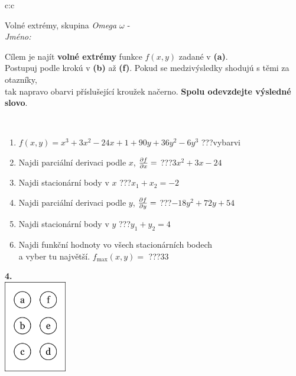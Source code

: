 \documentclass[10pt]{report}
\begin{document}
\begin{tabular}{c:c}
\begin{minipage}[c][104.5mm][t]{0.5\linewidth}
\begin{center}
\vspace{7mm}
{\huge Volné extrémy, skupina \textit{Omega $\omega$} -}\\[5mm]
\textit{Jméno:}\phantom{xxxxxxxxxxxxxxxxxxxxxxxxxxxxxxxxxxxxxxxxxxxxxxxxxxxxxxxxxxxxxxxxx}\\[5mm]
\begin{minipage}{0.95\linewidth}
\begin{center}
Cílem je najít \textbf{volné extrémy} funkce $f(x,y)$ zadané v \textbf{(a)}.\\Postupuj podle krokú v \textbf{(b)} až \textbf{(f)}. Pokud se medzivýsledky shodujú s těmi za otazníky,\\tak napravo obarvi příslušející kroužek načerno. \textbf{Spolu odevzdejte výsledné slovo}.
\end{center}
\end{minipage}
\\[1mm]
\begin{minipage}{0.79\linewidth}
\begin{center}
\begin{varwidth}{\linewidth}
\begin{enumerate}
\normalsize
\item $f(x,y)=x^3+3x^2-24x+1+90y+36y^2-6y^3$\quad \dotfill\; ???\;\dotfill \quad vybarvi
\item Najdi parciální derivaci podle $x$, $\pdv{f}{x}=$\quad \dotfill\; ???\;\dotfill \quad $3x^2+3x-24$
\item Najdi stacionární body v $x$\quad \dotfill\; ???\;\dotfill \quad $x_1+x_2=-2$
\item Najdi parciální derivaci podle $y$, $\pdv{f}{y}=$\quad \dotfill\; ???\;\dotfill \quad $-18y^2+72y+54$
\item Najdi stacionární body v $y$\quad \dotfill\; ???\;\dotfill \quad $y_1+y_2=4$
\item Najdi funkční hodnoty vo všech stacionárních bodech \\ \phantom{xxxxxx} a vyber tu najvětší. $f_{\text{max}}(x,y)=$\quad \dotfill\; ???\;\dotfill \quad $33$
\end{enumerate}
\end{varwidth}
\end{center}
\end{minipage}
\begin{minipage}{0.20\linewidth}
\begin{center}
{\Huge\bfseries 4.} \\[2mm]
\includegraphics[height=40mm]{../images/braille.png}

\end{center}
\end{minipage}
\end{center}
\end{minipage}
\end{tabular}
\end{document}
